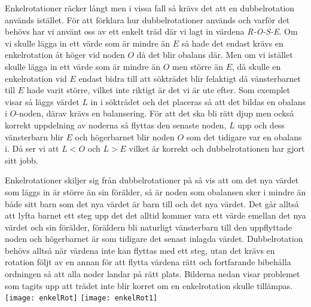 \documentclass[a5paper,10pt,oneside]{article}
\begin{document}
Enkelrotationer räcker långt men i vissa fall så krävs det att en dubbelrotation används istället. För att förklara hur dubbelrotationer används och varför det behövs har vi använt oss av ett enkelt träd där vi lagt in värdena \textit{R-O-S-E}. Om vi skulle lägga in ett värde som är mindre än $E$ så hade det endast krävs en enkelrotation åt höger vid noden $O$ då det blir obalans där. Men om vi istället skulle lägga in ett värde som är mindre än $O$ men större än $E$, då skulle en enkelrotation vid $E$ endast bidra till att sökträdet blir felaktigt då vänsterbarnet till $E$ hade varit  större, vilket inte riktigt är det vi är ute efter. Som exemplet visar så läggs värdet $L$ in i sökträdet och det placeras så att det bildas en obalans i $O$-noden, därav krävs en balansering. För att det ska bli rätt djup men också korrekt uppdelning av noderna så flyttas den senaste noden, $L$ upp och dess vänsterbarn blir $E$ och högerbarnet blir noden $O$ som det tidigare var en obalans i. Då ser vi att $L < O$ och  $L > E$ vilket är korrekt och dubbelrotationen har gjort sitt jobb.

Enkelrotationer skiljer sig från dubbelrotationer på så vis att om det nya värdet som läggs in är större än sin förälder, så är noden som obalansen sker i mindre än både sitt barn som det nya värdet är barn till och det nya värdet. Det går alltså att lyfta barnet ett steg upp det det alltid kommer vara ett värde emellan det nya värdet och sin förälder, föräldern bli naturligt vänsterbarn till den uppflyttade noden och högerbarnet är som tidigare det senast inlagda värdet. 
Dubbelrotation behövs alltså när värdena inte kan flyttas med ett steg, utan det krävs en rotation följt av en annan för att flytta värdena rätt och fortfarande bibehålla ordningen så att alla noder landar på rätt plats. Bilderna nedan visar problemet som tagits upp att trädet inte blir korret om en enkelrotation skulle tillämpas. \texttt{[image: enkelRot]} \texttt{[image: enkelRot1]}
\end{document}
